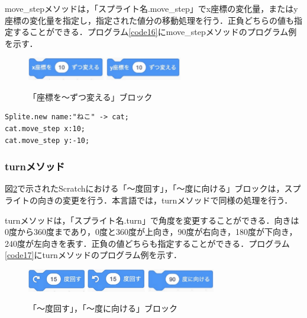 \documentclass[10pt,a4j]{ltjsarticle}
\begin{document}
move\_stepメソッドは，「スプライト名.move\_step」でx座標の変化量，またはy座標の変化量を指定し，指定された値分の移動処理を行う．正負どちらの値も指定することができる．プログラム\ref{code16}にmove\_stepメソッドのプログラム例を示す．

\begin{figure}[H]
  \centering
  \includegraphics[height=10mm]{images/step_x.pdf} 
  \includegraphics[height=10mm]{images/step_y.pdf} 
  \caption{「座標を〜ずつ変える」ブロック}
  \label{fig:step}
\end{figure}

\begin{lstlisting}[caption=move\_stepメソッドのプログラム例, label=code16]
Splite.new name:"ねこ" -> cat;
cat.move_step x:10; 
cat.move_step y:-10; 
\end{lstlisting}

\subsubsection{turnメソッド}
図\ref{fig:turn}で示されたScratchにおける「〜度回す」，「〜度に向ける」ブロックは，スプライトの向きの変更を行う．本言語では，turnメソッドで同様の処理を行う．

turnメソッドは，「スプライト名.turn」で角度を変更することができる．向きは0度から360度まであり，0度と360度が上向き，90度が右向き，180度が下向き，240度が左向きを表す．正負の値どちらも指定することができる．プログラム\ref{code17}にturnメソッドのプログラム例を示す．

\begin{figure}[H]
  \centering
  \includegraphics[height=10mm]{images/turn_right.pdf} 
  \includegraphics[height=10mm]{images/turn_left.pdf} 
  \includegraphics[height=10mm]{images/turn.pdf}
  \caption{「〜度回す」，「〜度に向ける」ブロック}
  \label{fig:turn}
\end{figure}
\end{document}
